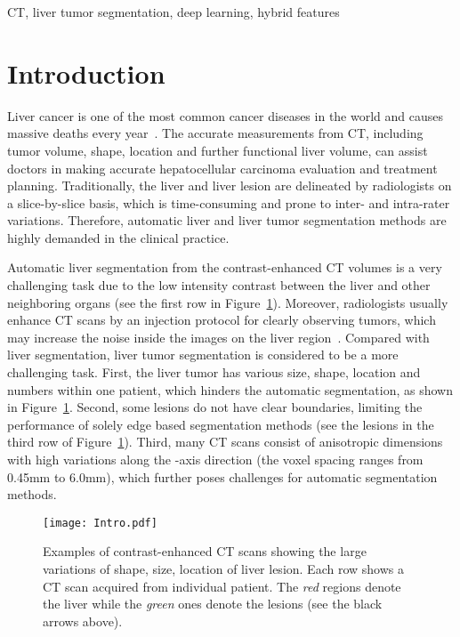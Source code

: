 \documentclass[journal]{IEEEtran}
\begin{document}
\begin{IEEEkeywords}
 CT, liver tumor segmentation, deep learning, hybrid features
\end{IEEEkeywords}
\IEEEpeerreviewmaketitle



\section{Introduction}
Liver cancer is one of the most common cancer diseases in the world and causes massive deaths every year~\citep{ferlay2010estimates,lu2006liver}.
The accurate measurements from CT, including tumor volume, shape, location and further functional liver volume, can assist doctors in making accurate hepatocellular carcinoma evaluation and treatment planning. 
Traditionally, the liver and liver lesion are delineated by radiologists on a slice-by-slice basis, which is time-consuming and prone to inter- and intra-rater variations. 
Therefore, automatic liver and liver tumor segmentation methods are highly demanded in the clinical practice.  

Automatic liver segmentation from the contrast-enhanced CT volumes is a very challenging task due to the low intensity contrast between the liver and other neighboring organs (see the first row in Figure~\ref{fig:challenges}). Moreover, radiologists usually enhance CT scans by an injection protocol for clearly observing tumors, which may increase the noise inside the images on the liver region~\cite{moghbel2017review}. Compared with liver segmentation, liver tumor segmentation is considered to be a more challenging task. First, the liver tumor has various size, shape, location and numbers within one patient, which hinders the automatic segmentation, as shown in Figure~\ref{fig:challenges}. Second, some lesions do not have clear boundaries, limiting the performance of solely edge based segmentation methods (see the lesions in the third row of Figure~\ref{fig:challenges}).
Third, many CT scans consist of anisotropic dimensions with high variations along the -axis direction (the voxel spacing ranges from 0.45mm to 6.0mm), which further poses challenges for automatic segmentation methods. 

\begin{figure}[t]
	\centering
	\texttt{[image: Intro.pdf]}
	\caption{Examples of contrast-enhanced CT scans showing the large variations of shape, size, location of liver lesion. Each row shows a CT scan acquired from individual patient. The \emph{red} regions denote the liver while the \emph{green} ones denote the lesions (see the black arrows above).}
	\label{fig:challenges}\centering
\end{figure}
\end{document}
